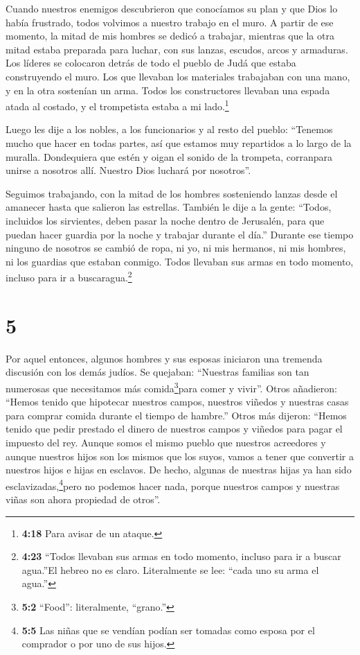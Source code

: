  Cuando nuestros enemigos descubrieron que conocíamos su
plan y que Dios lo había frustrado, todos volvimos a nuestro trabajo en
el muro.  A partir de ese momento, la mitad de mis hombres
se dedicó a trabajar, mientras que la otra mitad estaba preparada para
luchar, con sus lanzas, escudos, arcos y armaduras. Los líderes se
colocaron detrás de todo el pueblo de Judá  que estaba
construyendo el muro. Los que llevaban los materiales trabajaban con una
mano, y en la otra sostenían un arma.  Todos los
constructores llevaban una espada atada al costado, y el trompetista
estaba a mi lado.\footnote{\textbf{4:18} Para avisar de un ataque.}

 Luego les dije a los nobles, a los funcionarios y al resto
del pueblo: ``Tenemos mucho que hacer en todas partes, así que estamos
muy repartidos a lo largo de la muralla.  Dondequiera que
estén y oigan el sonido de la trompeta, corranpara unirse a nosotros
allí. Nuestro Dios luchará por nosotros''.

 Seguimos trabajando, con la mitad de los hombres
sosteniendo lanzas desde el amanecer hasta que salieron las estrellas.
 También le dije a la gente: ``Todos, incluidos los
sirvientes, deben pasar la noche dentro de Jerusalén, para que puedan
hacer guardia por la noche y trabajar durante el día.'' 
Durante ese tiempo ninguno de nosotros se cambió de ropa, ni yo, ni mis
hermanos, ni mis hombres, ni los guardias que estaban conmigo. Todos
llevaban sus armas en todo momento, incluso para ir a
buscaragua.\footnote{\textbf{4:23} ``Todos llevaban sus armas en todo
  momento, incluso para ir a buscar agua.''El hebreo no es claro.
  Literalmente se lee: ``cada uno su arma el agua.''}

\hypertarget{section-4}{%
\section{5}\label{section-4}}

 Por aquel entonces, algunos hombres y sus esposas iniciaron
una tremenda discusión con los demás judíos.  Se quejaban:
``Nuestras familias son tan numerosas que necesitamos más
comida\footnote{\textbf{5:2} ``Food'': literalmente, ``grano.''}para
comer y vivir''.  Otros añadieron: ``Hemos tenido que
hipotecar nuestros campos, nuestros viñedos y nuestras casas para
comprar comida durante el tiempo de hambre.''  Otros más
dijeron: ``Hemos tenido que pedir prestado el dinero de nuestros campos
y viñedos para pagar el impuesto del rey.  Aunque somos el
mismo pueblo que nuestros acreedores y aunque nuestros hijos son los
mismos que los suyos, vamos a tener que convertir a nuestros hijos e
hijas en esclavos. De hecho, algunas de nuestras hijas ya han sido
esclavizadas,\footnote{\textbf{5:5} Las niñas que se vendían podían ser
  tomadas como esposa por el comprador o por uno de sus hijos.}pero no
podemos hacer nada, porque nuestros campos y nuestras viñas son ahora
propiedad de otros''.

